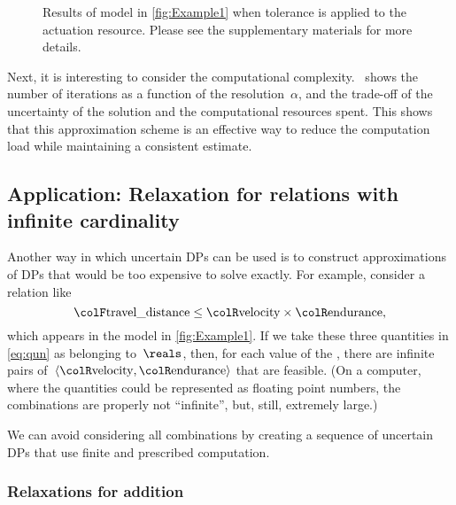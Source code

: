 \begin{figure}[h]

    \caption{Results of model in \cref{fig:Example1} when tolerance is applied
        to the actuation  resource.
        Please see the supplementary
        materials for more details.
    }
\end{figure}

Next, it is interesting to consider the computational complexity.
~shows the number of iterations as
a function of the resolution~$\alpha$, and the trade-off of the
uncertainty of the solution and the computational resources spent.
This shows that this approximation scheme is an effective way to reduce
the computation load while maintaining a consistent estimate.

\subsection{Application: Relaxation for relations with infinite cardinality\label{sec:Application-relax}}

Another way in which uncertain DPs can be used is to construct approximations
of DPs that would be too expensive to solve exactly.
For example,
consider a relation like
\begin{equation}
    {\colF\text{travel\_distance}}
    \leq{\colR\text{velocity}}\times{\colR\text{endurance}},\label{eq:qun}
\end{equation}
which appears in the model in \cref{fig:Example1}.
If we take
these three quantities in \cref{eq:qun} as belonging to~$\reals$,
then, for each value of the , there are infinite
pairs of~$\left\langle {\colR\text{velocity}},{\colR\text{endurance}}\right\rangle $
that are feasible.
(On a computer, where the quantities could be represented
as floating point numbers, the combinations are properly not ``infinite'',
but, still, extremely large.)

We can avoid considering all combinations by creating a sequence of
uncertain DPs that use finite and prescribed computation.

\subsubsection{Relaxations for addition}

